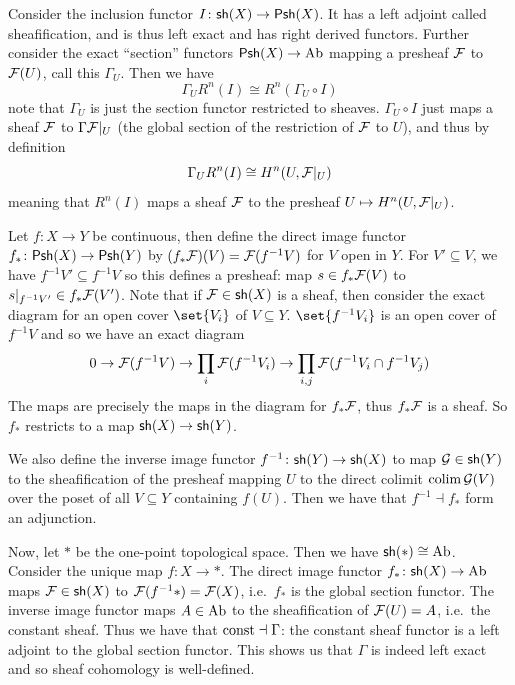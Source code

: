 \bexam

    Consider the inclusion functor $I\colon{\sf sh}(X)\to{\sf Psh}(X)$.
    It has a left adjoint called {\emphcolor sheafification}, and is thus left exact and has right derived functors.
    Further consider the exact ``section'' functors ${\sf Psh}(X)\to{\rm Ab}$ mapping a presheaf ${{\cal F}}$ to ${{\cal F}}(U)$, call this $\Gamma_U$.
    Then we have
    $$ \Gamma_UR^n(I) \cong R^n(\Gamma_U\circ I) $$
    note that $\Gamma_U$ is just the section functor restricted to sheaves.
    $\Gamma_U\circ I$ just maps a sheaf ${{\cal F}}$ to $\Gamma{{\cal F}}|_U$ (the global section of the restriction of ${{\cal F}}$ to $U$), and thus by definition
    $$ \Gamma_UR^n(I) \cong H^n(U,{{\cal F}}|_U) $$
    meaning that $R^n(I)$ maps a sheaf ${{\cal F}}$ to the presheaf $U\mapsto H^n(U,{{\cal F}}|_U)$.

\eexam

\bexam

    Let $f\colon X\to Y$ be continuous, then define the {\emphcolor direct image} functor $f_*\colon{\sf Psh}(X)\to{\sf Psh}(Y)$ by $(f_*{{\cal F}})(V)={{\cal F}}(f^{-1}V)$
    for $V$ open in $Y$.
    For $V'\subseteq V$, we have $f^{-1}V'\subseteq f^{-1}V$ so this defines a presheaf: map $s\in f_*{{\cal F}}(V)$ to $s|_{f^{-1}V'}\in f_*{{\cal F}}(V')$.
    Note that if ${{\cal F}}\in{\sf sh}(X)$ is a sheaf, then consider the exact diagram for an open cover $\set{V_i}$ of $V\subseteq Y$.
    $\set{f^{-1}V_i}$ is an open cover of $f^{-1}V$ and so we have an exact diagram
    $$ 0 \to {{\cal F}}(f^{-1}V) \to \prod_i{{\cal F}}(f^{-1}V_i) \to \prod_{i,j}{{\cal F}}(f^{-1}V_i\cap f^{-1}V_j) $$
    The maps are precisely the maps in the diagram for $f_*{{\cal F}}$, thus $f_*{{\cal F}}$ is a sheaf.
    So $f_*$ restricts to a map ${\sf sh}(X)\to{\sf sh}(Y)$.

    We also define the {\emphcolor inverse image} functor $f^{-1}\colon{\sf sh}(Y)\to{\sf sh}(X)$ to map ${{\cal G}}\in{\sf sh}(Y)$ to the sheafification of the presheaf
    mapping $U$ to the direct colimit $\mathop{\rm colim}\nolimits{{\cal G}}(V)$ over the poset of all $V\subseteq Y$ containing $f(U)$.
    Then we have that $f^{-1}\dashv f_*$ form an adjunction.

    Now, let $*$ be the one-point topological space.
    Then we have ${\sf sh}(*)\cong{\rm Ab}$.
    Consider the unique map $f\colon X\to*$.
    The direct image functor $f_*\colon{\sf sh}(X)\to{\rm Ab}$ maps ${{\cal F}}\in{\sf sh}(X)$ to ${{\cal F}}(f^{-1}*)={{\cal F}}(X)$, i.e.\ $f_*$ is the global section functor.
    The inverse image functor maps $A\in{\rm Ab}$ to the sheafification of ${{\cal F}}(U)=A$, i.e.\ the constant sheaf.
    Thus we have that ${\rm const}\dashv\Gamma$: the constant sheaf functor is a left adjoint to the global section functor.
    This shows us that $\Gamma$ is indeed left exact and so sheaf cohomology is well-defined.

